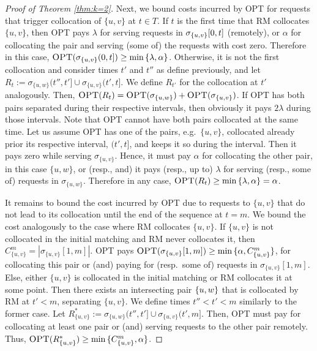 \documentclass[a4paper,anonymous,USenglish]{lipics-v2019}
\newcommand{\OPT}{\textsc{OPT}\xspace}
\newcommand{\RM}{\textsc{RM}\xspace} %
\DeclarePairedDelimiter\set{\{}{\}}
\begin{document}
\begin{proof}[Proof of Theorem \ref{thm:k=2}]
	Next,
	we bound  costs incurred by \OPT for requests that trigger collocation of $\{u,v\}$ at $t \in T$.
	If $t$ is the first time that \RM collocates $\{u,v\}$,
	 then  \OPT pays
	$\lambda$ for serving requests in $\sigma_{\set{u,v}}[0,t]$ (remotely),
	or $\alpha$ for collocating the pair and
	serving (some of) the requests with  cost zero.
	Therefore in this case,
	$\OPT(\sigma_{\{u,v\}}(0,t]) \geq  \min{\{ \lambda,\alpha \}}$.
	Otherwise,
	it is not the first collocation and
	consider times $t'$ and $t''$ as define previously,
	 and let 
	$R_t := \sigma_{\{u,w\}}(t'',t'] \cup \sigma_{\{u,v\}}(t',t] $.
	We define $R_{t'}$ for the collocation at $t'$  analogously.
	Then,
	$\OPT(R_t) =\OPT (\sigma_{\{u,w\}}) 
	+ \OPT(\sigma_{\{u,v\}}) $.
	If \OPT has both pairs separated during their respective intervals,
	then obviously it pays $2\lambda$ during those intervals.
	Note that \OPT cannot have both pairs collocated at the same time.
	Let us assume \OPT has one of the pairs,
	e.g.~$\{u,v\}$,
	 collocated already prior its respective interval, $(t',t]$,
	 and keeps it so during the interval.
	 Then it pays zero while serving $\sigma_{\{u,v\}}$.
	Hence,
	it must pay $\alpha$ for collocating the other pair, in this case $\{u,w\}$,
	or (resp., and) it pays (resp., up to) $\lambda$ for serving (resp., some of) requests in $\sigma_{\{u,w\}}$. 
	Therefore in any case,
	$\OPT(R_t) \geq  \min{\{ \lambda,\alpha \}} = \alpha$.
	
	It remains to bound the cost  incurred by \OPT due to requests to $\{u,v\}$ that do not lead to its collocation until the end of the sequence at $t=m$.
	We bound the cost analogously to the case where \RM collocates $\{u,v\}$.
	If $\{u,v\}$ is not collocated in the initial matching
	and \RM never collocates it,
	then $ C^{m}_{ \{u,v\} } =| \sigma_{\{u,v\}}[1,m] |$.
	\OPT pays
	$\OPT(\sigma_{\{u,v\}}[1,m]) 
	\geq \min{ \{ \alpha, C^{m}_{ \{u,v\} } \} }$,
	for collocating this pair or (and) paying for (resp.~some of) requests in $\sigma_{\{u,v\}}[1,m]$.
	Else,
	either $\{u,v\}$ is collocated in the initial matching
	or \RM collocates it at some point.
	Then there exists an intersecting pair $\set{u,w}$
	that is collocated by \RM at $t' < m$,
	separating $\{u,v\}$.
	We define times $t'' < t' < m$ similarly to the former case.
	Let $R^*_{\{u,v\}} := \sigma_{\{u,w\}} (t'',t'] \cup \sigma_{\{u,v\}} (t',m]$.
	Then,
	\OPT must pay for collocating at least one pair or (and) serving requests 
	to the other pair remotely.
	Thus,
	$\OPT (R^*_{\{u,v\}}) 
	\geq  \min{ \{ C^{m}_{ \{u,v\}}, \alpha \}}$.
	

\end{proof}
\end{document}
